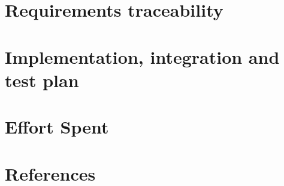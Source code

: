 \documentclass{Configuration_Files/PoliMi3i_thesis}
\begin{document}
\chapter{Requirements traceability}
\label{c:requirements_traceability}%


\chapter{Implementation, integration and test plan}
\label{c:implementation_integration_test_plan}%


\chapter{Effort Spent}
\label{c:effort}%


\chapter*{References}
\label{c:references}%
%




\cleardoublepage
{} %
\end{document}
